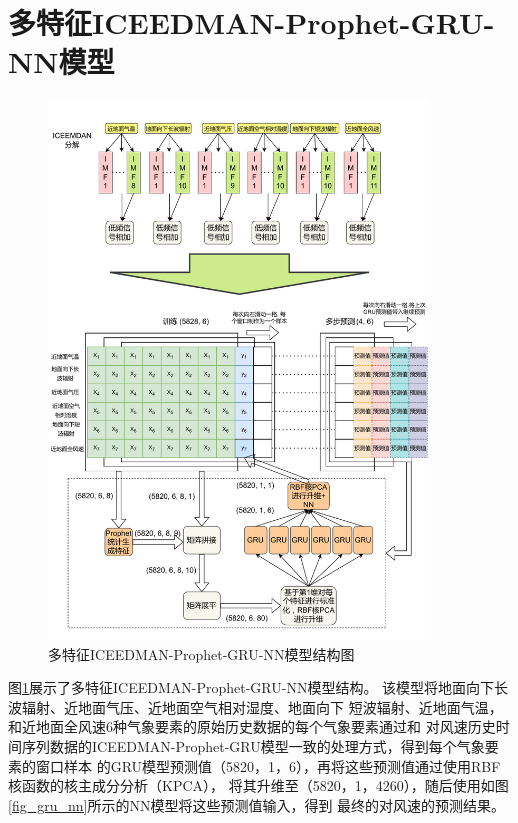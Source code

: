 \documentclass[AutoFakeBold]{LZUThesis}
\begin{document}
\section{多特征ICEEDMAN-Prophet-GRU-NN模型}
\begin{figure}[H]
	\centering
    \includegraphics[width=0.9\textwidth]{figures/ICEEMDAN-Prophet-GRU-All-Features.pdf}
    \caption{多特征ICEEDMAN-Prophet-GRU-NN模型结构图}
    \label{fig_ICEEMDAN_Prophet_GRU_All_Features}
\end{figure}
图\ref{fig_ICEEMDAN_Prophet_GRU_All_Features}展示了多特征ICEEDMAN-Prophet-GRU-NN模型结构。
该模型将地面向下长波辐射、近地面气压、近地面空气相对湿度、地面向下
短波辐射、近地面气温，和近地面全风速6种气象要素的原始历史数据的每个气象要素通过和
对风速历史时间序列数据的ICEEDMAN-Prophet-GRU模型一致的处理方式，得到每个气象要素的窗口样本
的GRU模型预测值（5820，1，6），再将这些预测值通过使用RBF核函数的核主成分分析（KPCA），
将其升维至（5820，1，4260），随后使用如图\ref{fig_gru_nn}所示的NN模型将这些预测值输入，得到
最终的对风速的预测结果。
\end{document}
